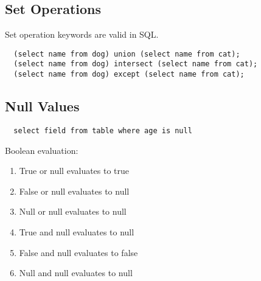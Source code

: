\documentclass{math}
\begin{document}
\subsection*{Set Operations}
Set operation keywords are valid in SQL.
\begin{lstlisting}
  (select name from dog) union (select name from cat);
  (select name from dog) intersect (select name from cat);
  (select name from dog) except (select name from cat);
\end{lstlisting}

\subsection*{Null Values}
\begin{lstlisting}
  select field from table where age is null
\end{lstlisting}
Boolean evaluation:
\begin{enumerate}
  \item True or null evaluates to true
  \item False or null evaluates to null
  \item Null or null evaluates to null
  \item True and null evaluates to null
  \item False and null evaluates to false
  \item Null and null evaluates to null
\end{enumerate}
\end{document}
